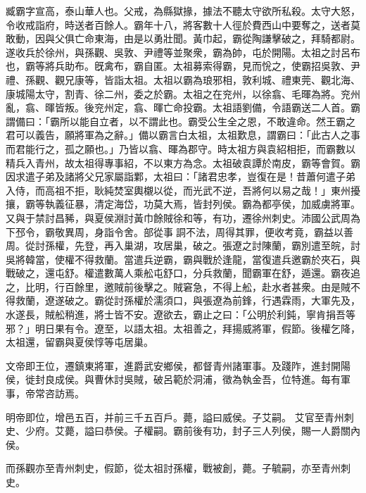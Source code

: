 \begin{pinyinscope}
 
 
 臧霸字宣高，泰山華人也。父戒，為縣獄掾，據法不聽太守欲所私殺。太守大怒，令收戒詣府，時送者百餘人。霸年十八，將客數十人徑於費西山中要奪之，送者莫敢動，因與父俱亡命東海，由是以勇壯聞。黃巾起，霸從陶謙擊破之，拜騎都尉。遂收兵於徐州，與孫觀、吳敦、尹禮等並聚衆，霸為帥，屯於開陽。太祖之討呂布也，霸等將兵助布。旣禽布，霸自匿。太祖募索得霸，見而恱之，使霸招吳敦、尹禮、孫觀、觀兄康等，皆詣太祖。太祖以霸為琅邪相，敦利城、禮東莞、觀北海、康城陽太守，割青、徐二州，委之於霸。太祖之在兖州，以徐翕、毛暉為將。兖州亂，翕、暉皆叛。後兖州定，翕、暉亡命投霸。太祖語劉備，令語霸送二人首。霸謂備曰：「霸所以能自立者，以不謂此也。霸受公生全之恩，不敢違命。然王霸之君可以義告，願將軍為之辭。」備以霸言白太祖，太祖歎息，謂霸曰：「此古人之事而君能行之，孤之願也。」乃皆以翕、暉為郡守。時太祖方與袁紹相拒，而霸數以精兵入青州，故太祖得專事紹，不以東方為念。太祖破袁譚於南皮，霸等會賀。霸因求遣子弟及諸將父兄家屬詣鄴，太祖曰：「諸君忠孝，豈復在是！昔蕭何遣子弟入侍，而高祖不拒，耿純焚室輿櫬以從，而光武不逆，吾將何以易之哉！」東州擾攘，霸等執義征暴，清定海岱，功莫大焉，皆封列侯。霸為都亭侯，加威虜將軍。又與于禁討昌豨，與夏侯淵討黃巾餘賊徐和等，有功，遷徐州刺史。沛國公武周為下邳令，霸敬異周，身詣令舍。部從事𧩪詷不法，周得其罪，便收考竟，霸益以善周。從討孫權，先登，再入巢湖，攻居巢，破之。張遼之討陳蘭，霸別遣至皖，討吳將韓當，使權不得救蘭。當遣兵逆霸，霸與戰於逢龍，當復遣兵邀霸於夾石，與戰破之，還屯舒。權遣數萬人乘舩屯舒口，分兵救蘭，聞霸軍在舒，遁還。霸夜追之，比明，行百餘里，邀賊前後擊之。賊窘急，不得上舩，赴水者甚衆。由是賊不得救蘭，遼遂破之。霸從討孫權於濡須口，與張遼為前鋒，行遇霖雨，大軍先及，水遂長，賊舩稍進，將士皆不安。遼欲去，霸止之曰：「公明於利鈍，寧肯捐吾等邪？」明日果有令。遼至，以語太祖。太祖善之，拜揚威將軍，假節。後權乞降，太祖還，留霸與夏侯惇等屯居巢。
 
 
 
 
 文帝即王位，遷鎮東將軍，進爵武安鄉侯，都督青州諸軍事。及踐阼，進封開陽侯，徙封良成侯。與曹休討吳賊，破呂範於洞浦，徵為執金吾，位特進。每有軍事，帝常咨訪焉。
 
 
 明帝即位，增邑五百，并前三千五百戶。薨，謚曰威侯。子艾嗣。
 艾官至青州刺史、少府。艾薨，謚曰恭侯。子權嗣。霸前後有功，封子三人列侯，賜一人爵關內侯。
 
 
而孫觀亦至青州刺史，假節，從太祖討孫權，戰被創，薨。子毓嗣，亦至青州刺史。
 
 
\end{pinyinscope}